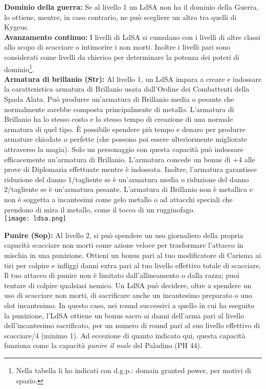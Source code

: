 \documentclass[a4paper]{report}
\begin{document}
\begin{multicols}{2}
\textbf{Dominio della guerra:}  Se al livello 1 un LdSA non ha il dominio della Guerra, lo ottiene, mentre, in caso contrario, ne può scegliere un altro tra quelli di Kygeus.\\

\textbf{Avanzamento continuo:}  I livelli di LdSA si cumulano con i livelli di altre classi allo scopo di scacciare o intimorire i non morti. Inoltre i livelli pari sono considerati come livelli da chierico per determinare la potenza dei poteri di dominio\footnote{Nella tabella li ho indicati con d.g.p.: domain granted power, per motivi di spazio.}.\\

\textbf{Armatura di brillanio (Str):}  Al livello 1, un LdSA impara a creare e indossare la caratteristica armatura di Brillanio usata dall'Ordine dei Combattenti della Spada Alata. Può produrre un'armatura di Brillanio media o pesante che normalmente sarebbe composta principalmente di metallo. L'armatura di Brillanio ha lo stesso costo e lo stesso tempo di creazione di una normale armatura di quel tipo. È possibile spendere più tempo e denaro per produrre armature chiodate o perfette (che possono poi essere ulteriormente migliorate attraverso la magia). Solo un personaggio con questa capacità può indossare efficacemente un'armatura di Brillanio. L'armatura concede un bonus di +4 alle prove di Diplomazia effettuate mentre è indossata. Inoltre, l'armatura garantisce riduzione del danno 1/tagliente se è un'armatura media o riduzione del danno 2/tagliente se è un'armatura pesante. L'armatura di Brillanio non è metallica e non è soggetta a incantesimi come gelo metallo o ad attacchi speciali che prendono di mira il metallo, come il tocco di un rugginofago.\\

\texttt{[image: ldsa.png]}

\textbf{Punire (Sop):} Al livello 2, si può spendere un uso giornaliero della propria capacità scacciare non morti come azione veloce per trasformare l’attacco in mischia in una punizione. Ottieni un bonus pari al tuo modificatore di Carisma ai tiri per colpire e infliggi danni extra pari al tuo livello effettivo totale di scacciare. Il tuo attacco di punire non è limitato dall'allineamento o dalla razza; puoi tentare di colpire qualsiasi nemico. Un LdSA può decidere, oltre a spendere un uso di scacciare non morti, di sacrificare anche un incantesimo preparato o uno slot incantesimo. In questo caso, nei round successivi a quello in cui ha eseguito la punizione, l’LdSA ottiene un bonus sacro ai danni dell’arma pari al livello dell’incantesimo sacrificato, per un numero di round pari al suo livello effettivo di scacciare/4 (minimo 1). Ad eccezione di quanto indicato qui, questa capacità funziona come la capacità \textit{punire il male} del Paladino (PH 44).\\


\end{multicols}
\end{document}
